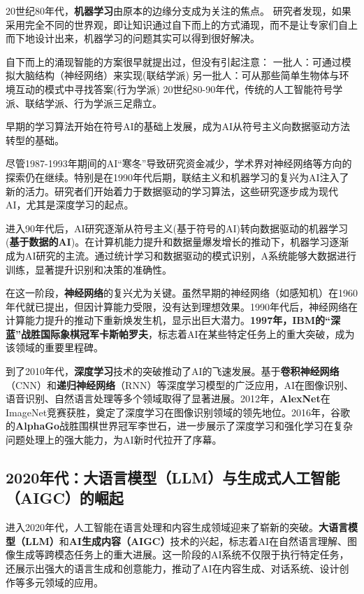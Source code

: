 20世纪80年代，{\bf 机器学习}由原本的边缘分支成为关注的焦点。
研究者发现，如果采用完全不同的世界观，即让知识通过自下而上的方式涌现，而不是让专家们自上而下地设计出来，机器学习的问题其实可以得到很好解决。

自下而上的涌现智能的方案很早就提出过，但没有引起注意：
 	一批人：可通过模拟大脑结构（神经网络）来实现(联结学派)
 	另一批人：可从那些简单生物体与环境互动的模式中寻找答案(行为学派)
 20世纪80-90年代，传统的人工智能符号学派、联结学派、行为学派三足鼎立。

早期的学习算法开始在符号AI的基础上发展，成为AI从符号主义向数据驱动方法转型的基础。

尽管1987-1993年期间的AI“寒冬”导致研究资金减少，学术界对神经网络等方向的探索仍在继续。特别是在1990年代后期，联结主义和机器学习的复兴为AI注入了新的活力。研究者们开始着力于数据驱动的学习算法，这些研究逐步成为现代AI，尤其是深度学习的起点。

进入90年代后，AI研究逐渐从符号主义(基于符号的AI)转向数据驱动的机器学习({\bf 基于数据的AI})。在计算机能力提升和数据量爆发增长的推动下，机器学习逐渐成为AI研究的主流。通过统计学习和数据驱动的模式识别，A系统能够大数据进行训练，显著提升识别和决策的准确性。

在这一阶段，{\bf 神经网络}的复兴尤为关键。虽然早期的神经网络（如感知机）在1960年代就已提出，但因计算能力受限，没有达到理想效果。1990年代后，神经网络在计算能力提升的推动下重新焕发生机，显示出巨大潜力。{\bf 1997年，IBM的“深蓝”战胜国际象棋冠军卡斯帕罗夫}，标志着AI在某些特定任务上的重大突破，成为该领域的重要里程碑。

到了2010年代，{\bf 深度学习}技术的突破推动了AI的飞速发展。基于{\bf 卷积神经网络}（CNN）和{\bf 递归神经网络}（RNN）等深度学习模型的广泛应用，AI在图像识别、语音识别、自然语言处理等多个领域取得了显著进展。2012年，{\bf AlexNet}在ImageNet竞赛获胜，奠定了深度学习在图像识别领域的领先地位。2016年，谷歌的{\bf AlphaGo}战胜围棋世界冠军李世石，进一步展示了深度学习和强化学习在复杂问题处理上的强大能力，为AI新时代拉开了序幕。

\subsection{2020年代：大语言模型（LLM）与生成式人工智能（AIGC）的崛起}
进入2020年代，人工智能在语言处理和内容生成领域迎来了崭新的突破。{\bf 大语言模型（LLM）}和{\bf AI生成内容（AIGC）}技术的兴起，标志着AI在自然语言理解、图像生成等跨模态任务上的重大进展。这一阶段的AI系统不仅限于执行特定任务，还展示出强大的语言生成和创意能力，推动了AI在内容生成、对话系统、设计创作等多元领域的应用。

